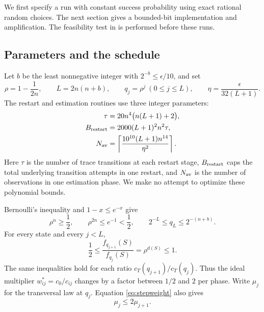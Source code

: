 \documentclass[11pt]{article}
\theoremstyle{definition}
\begin{document}
We first specify a run with constant success probability using exact
rational random choices.  The next section gives a bounded-bit
implementation and amplification.  The feasibility test in
 is performed before these runs.

\subsection{Parameters and the schedule}

Let $b$ be the least nonnegative integer with $2^{-b}\le\epsilon/10$,
and set
\begin{equation}\label{eq:schedule}
 \rho=1-\frac1{2n},\qquad L=2n(n+b),\qquad
 q_j=\rho^j\ (0\le j\le L),\qquad
 \eta=\frac{\epsilon}{32(L+1)}.
\end{equation}
The restart and estimation routines use three integer parameters:
\begin{equation}\label{eq:parameters}
 \begin{split}
 \tau&=20n^4\bigl(n(L+1)+2\bigr),\\
 B_{\rm restart}&=2000(L+1)^2n^2\tau,\\
 N_{\rm av}&=\left\lceil\frac{10^{10}(L+1)n^{14}}{\eta^2}\right\rceil.
 \end{split}
\end{equation}
Here $\tau$ is the number of trace transitions at each restart stage,
$B_{\rm restart}$ caps the total underlying transition attempts in one
restart, and $N_{\rm av}$ is the number of observations in one estimation
phase.  We make no attempt to optimize these polynomial bounds.

Bernoulli's inequality and $1-x\le e^{-x}$ give
\begin{equation}\label{eq:schedulebounds}
 \rho^n\ge\frac12,\qquad
 \rho^{2n}\le e^{-1}<\frac12,\qquad
 2^{-L}\le q_L\le2^{-(n+b)}.
\end{equation}
For every state and every $j<L$,
\begin{equation}\label{eq:stepweight}
 \frac12\le\frac{f_{q_{j+1}}(S)}{f_{q_j}(S)}
       =\rho^{d(S)}\le1.
\end{equation}
The same inequalities hold for each ratio $c_T(q_{j+1})/c_T(q_j)$.
Thus the ideal multiplier $w^*_{ij}=c_0/c_{ij}$ changes by a factor
between $1/2$ and $2$ per phase.  Write $\mu_j$ for the transversal law
at $q_j$.  Equation \eqref{eq:stepweight} also gives
\begin{equation}\label{eq:mudrift}
 \mu_j\le2\mu_{j+1}.
\end{equation}
\end{document}
